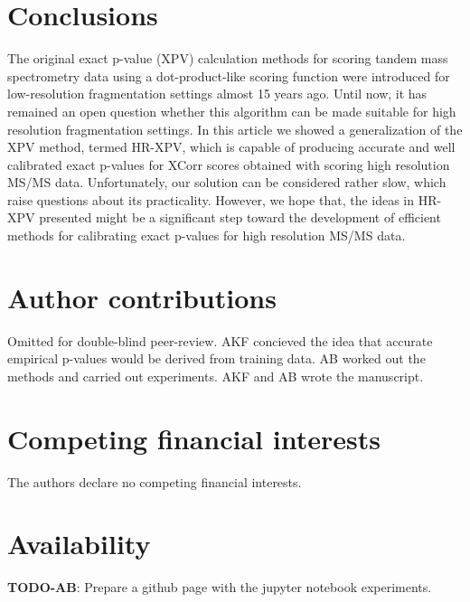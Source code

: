 \documentclass{article}
\newcommand{\todo}[2]{{\color{red} {\bf TODO-#1}: #2}}
\begin{document}
\section{Conclusions}
The original exact p-value (XPV) calculation methods for scoring tandem mass spectrometry data using a dot-product-like scoring function were introduced for low-resolution fragmentation settings almost 15 years ago. Until now, it has remained an open question whether this algorithm can be made suitable for high resolution fragmentation settings. In this article we showed a generalization of the XPV method, termed HR-XPV, which is capable of producing accurate and well calibrated exact p-values for XCorr scores obtained with scoring high resolution MS/MS data. Unfortunately, our solution can be considered rather slow, which raise questions about its practicality. However, we hope that, the ideas in HR-XPV presented might be a significant step toward the development of efficient methods for calibrating exact p-values for high resolution MS/MS data. 

\section*{Author contributions}
\ifdefined\DOUBLEBLINDREVIEW
Omitted for double-blind peer-review.
\else
AKF concieved the idea that accurate empirical p-values would be derived from training data. AB worked out the methods and carried out experiments. AKF and AB wrote the manuscript.
\fi

\section*{Competing financial interests}
The authors declare no competing financial interests.


\section*{Availability}
\todo{AB}{Prepare a github page with the jupyter notebook experiments.}

%


\end{document}
